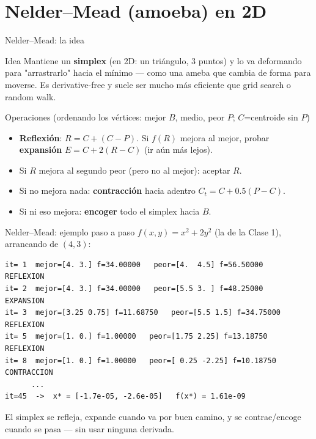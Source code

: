\documentclass[aspectratio=169,10pt]{beamer}
\begin{document}
\section{Nelder--Mead (amoeba) en 2D}

\begin{frame}{Nelder--Mead: la idea}
  \begin{block}{Idea}
    Mantiene un \textbf{simplex} (en 2D: un triángulo, 3 puntos) y lo va
    deformando para "arrastrarlo" hacia el mínimo — como una ameba que
    cambia de forma para moverse. Es derivative-free y suele ser mucho
    más eficiente que grid search o random walk.
  \end{block}
  \begin{block}{Operaciones (ordenando los vértices: mejor $B$, medio,
    peor $P$; $C$=centroide sin $P$)}
    \begin{itemize}
      \item \textbf{Reflexión}: $R=C+(C-P)$. Si $f(R)$ mejora al mejor,
        probar \textbf{expansión} $E=C+2(R-C)$ (ir aún más lejos).
      \item Si $R$ mejora al segundo peor (pero no al mejor): aceptar $R$.
      \item Si no mejora nada: \textbf{contracción} hacia adentro
        $C_t=C+0.5(P-C)$.
      \item Si ni eso mejora: \textbf{encoger} todo el simplex hacia $B$.
    \end{itemize}
  \end{block}
\end{frame}

\begin{frame}[fragile]{Nelder--Mead: ejemplo paso a paso}
  $f(x,y)=x^2+2y^2$ (la de la Clase 1), arrancando de $(4,3)$:
  \tiny
\begin{lstlisting}
it= 1  mejor=[4. 3.] f=34.00000   peor=[4.  4.5] f=56.50000   REFLEXION
it= 2  mejor=[4. 3.] f=34.00000   peor=[5.5 3. ] f=48.25000   EXPANSION
it= 3  mejor=[3.25 0.75] f=11.68750   peor=[5.5 1.5] f=34.75000   REFLEXION
it= 5  mejor=[1. 0.] f=1.00000   peor=[1.75 2.25] f=13.18750   REFLEXION
it= 8  mejor=[1. 0.] f=1.00000   peor=[ 0.25 -2.25] f=10.18750   CONTRACCION
      ...
it=45  ->  x* = [-1.7e-05, -2.6e-05]   f(x*) = 1.61e-09
\end{lstlisting}
  \normalsize
  El simplex se refleja, expande cuando va por buen camino, y se
  contrae/encoge cuando se pasa — sin usar ninguna derivada.
\end{frame}
\end{document}
